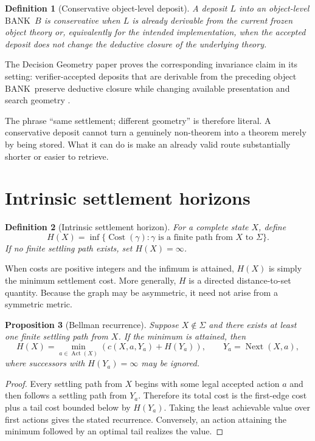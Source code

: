 \documentclass[11pt]{article}
\newtheorem{definition}{Definition}[section]
\newtheorem{proposition}[definition]{Proposition}
\theoremstyle{remark}
\newcommand{\BANK}{\ensuremath{\mathrm{BANK}}}
\newcommand{\Cost}{\operatorname{Cost}}
\newcommand{\Act}{\operatorname{Act}}
\newcommand{\Next}{\operatorname{Next}}
\begin{document}
\begin{definition}[Conservative object-level deposit]
A deposit $L$ into an object-level \BANK\ $B$ is conservative when $L$ is already derivable from the current frozen object theory or, equivalently for the intended implementation, when the accepted deposit does not change the deductive closure of the underlying theory.
\end{definition}

The Decision Geometry paper proves the corresponding invariance claim in its setting: verifier-accepted deposits that are derivable from the preceding object \BANK\ preserve deductive closure while changing available presentation and search geometry \cite{TennesonAMLDII}.

The phrase ``same settlement; different geometry'' is therefore literal. A conservative deposit cannot turn a genuinely non-theorem into a theorem merely by being stored. What it can do is make an already valid route substantially shorter or easier to retrieve.

\section{Intrinsic settlement horizons}

\begin{definition}[Intrinsic settlement horizon]
For a complete state $X$, define
\[
H(X)=\inf\{\Cost(\gamma):\gamma\text{ is a finite path from }X\text{ to }\Sigma\}.
\]
If no finite settling path exists, set $H(X)=\infty$.
\end{definition}

When costs are positive integers and the infimum is attained, $H(X)$ is simply the minimum settlement cost. More generally, $H$ is a directed distance-to-set quantity. Because the graph may be asymmetric, it need not arise from a symmetric metric.

\begin{proposition}[Bellman recurrence]
Suppose $X\notin\Sigma$ and there exists at least one finite settling path from $X$. If the minimum is attained, then
\[
H(X)=\min_{a\in\Act(X)}\left(c(X,a,Y_a)+H(Y_a)\right),
\qquad Y_a=\Next(X,a),
\]
where successors with $H(Y_a)=\infty$ may be ignored.
\end{proposition}

\begin{proof}
Every settling path from $X$ begins with some legal accepted action $a$ and then follows a settling path from $Y_a$. Therefore its total cost is the first-edge cost plus a tail cost bounded below by $H(Y_a)$. Taking the least achievable value over first actions gives the stated recurrence. Conversely, an action attaining the minimum followed by an optimal tail realizes the value.
\end{proof}
\end{document}

